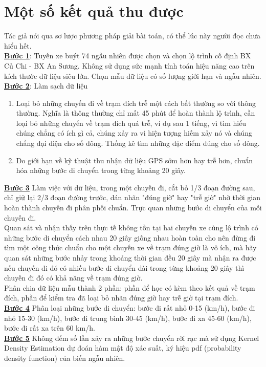 \documentclass[a4paper, 13pt]{report}
\begin{document}
\section{Một số kết quả thu được}
Tác giả nói qua sơ lược phương pháp giải bài toán, có thể lúc này người đọc chưa hiểu hết.\\
\textbf{\underline{Bước 1}}: Tuyến xe buýt 74 ngẫu nhiên được chọn và chọn lộ trình cố định BX Củ Chi - BX An Sương. Không sử dụng sức mạnh tính toán hiệu năng cao trên kích thước dữ liệu siêu lớn. Chọn mẫu dữ liệu có số lượng giới hạn và ngẫu nhiên.\\
\textbf{\underline{Bước 2}}: Làm sạch dữ liệu
\begin{enumerate}
\item Loại bỏ những chuyến đi về trạm đích trễ một cách bất thường so với thông thường. Nghĩa là thông thường chỉ mất 45 phút để hoàn thành lộ trình, cần loại bỏ những chuyến về trạm đích quá trễ, ví dụ sau 1 tiếng, vì tìm hiểu chúng chẳng có ích gì cả, chúng xảy ra vì hiện tượng hiếm xảy nó và chúng chẳng đại diện cho số đông. Thống kê tìm những đặc điểm đúng cho số đông. 
\item Do giới hạn về kỹ thuật thu nhận dữ liệu GPS sớm hơn hay trễ hơn, chuẩn hóa những bước di chuyển trong từng khoảng 20 giây.
\end{enumerate}
\textbf{\underline{Bước 3}} Làm việc với dữ liệu, trong một chuyến đi, cắt bỏ 1/3 đoạn đường sau, chỉ giữ lại 2/3 đoạn đường trước, dán nhãn "đúng giờ" hay "trễ giờ" nhờ thời gian hoàn thành chuyến đi phân phối chuẩn. Trực quan những bước di chuyển của mỗi chuyến đi.\\
Quan sát và nhận thấy trên thực tế không tồn tại hai chuyến xe cùng lộ trình có những bước di chuyển cách nhau 20 giây giống nhau hoàn toàn cho nên đừng đi tìm một công thức chuẩn cho một chuyến xe về trạm đúng giờ là vô ích, mà hãy quan sát những bước nhảy trong khoảng thời gian đều 20 giây mà nhận ra được nếu chuyến đi đó có nhiều bước di chuyển dài trong từng khoảng 20 giây thì chuyến đi đó có khả năng về trạm đúng giờ.\\
Phân chia dữ liệu mẫu thành 2 phần: phần để học có kèm theo kết quả về trạm đích, phần để kiểm tra đã loại bỏ nhãn đúng giờ hay trễ giờ tại trạm đích.\\
\textbf{\underline{Bước 4}} Phân loại những bước di chuyển: bước đi rất nhỏ 0-15 (km/h), bước đi nhỏ 15-30 (km/h), bước đi trung bình 30-45 (km/h), bước đi xa 45-60 (km/h), bước đi rất xa trên 60 km/h.\\
\textbf{\underline{Bước 5}} Không đếm số lần xảy ra những bước chuyển rời rạc mà sử dụng Kernel Density Estimation dự đoán hàm mật độ xác suất, ký hiệu pdf (probability density function) của biến ngẫu nhiên.\\ 
\end{document}
